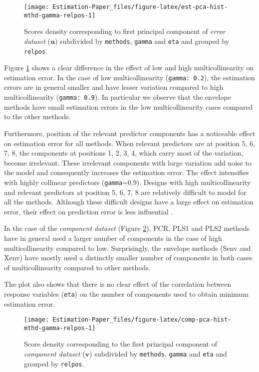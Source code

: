 \documentclass[12pt,3p,authoryear]{elsarticle}
\begin{document}
\begin{figure}[!htb]
\texttt{[image: Estimation-Paper\_files/figure-latex/est-pca-hist-mthd-gamma-relpos-1]} \caption{Scores density corresponding to first principal component of \emph{error dataset} (\(\mathbf{u}\)) subdivided by \texttt{methods}, \texttt{gamma} and \texttt{eta} and grouped by \texttt{relpos}.}\label{fig:est-pca-hist-mthd-gamma-relpos}
\end{figure}

Figure \ref{fig:est-pca-hist-mthd-gamma-relpos} shows a clear difference in the effect of low and high multicollinearity on estimation error. In the case of low multicollinearity (\texttt{gamma:\ 0.2}), the estimation errors are in general smaller and have lesser variation compared to high multicollinearity (\texttt{gamma:\ 0.9}). In particular we observe that the envelope methods have small estimation errors in the low multicollinearity cases compared to the other methods.

Furthermore, position of the relevant predictor components has a noticeable effect on estimation error for all methods. When relevant predictors are at position 5, 6, 7, 8, the components at positions 1, 2, 3, 4, which carry most of the variation, become irrelevant. These irrelevant components with large variation add noise to the model and consequently increases the estimation error. The effect intensifies with highly collinear predictors (\texttt{gamma}=0.9). Designs with high multicollinearity and relevant predictors at position 5, 6, 7, 8 are relatively difficult to model for all the methods. Although these difficult designs have a large effect on estimation error, their effect on prediction error is less influential \citep{rimal2019pred}.



In the case of the \emph{component dataset} (Figure \ref{fig:comp-pca-hist-mthd-gamma-relpos}), PCR, PLS1 and PLS2 methods have in general used a larger number of components in the case of high multicollinearity compared to low. Surprisingly, the envelope methods (Senv and Xenv) have mostly used a distinctly smaller number of components in both cases of multicollinearity compared to other methods.

The plot also shows that there is no clear effect of the correlation between response variables (\texttt{eta}) on the number of components used to obtain minimum estimation error.

\begin{figure}[!htb]
\texttt{[image: Estimation-Paper\_files/figure-latex/comp-pca-hist-mthd-gamma-relpos-1]} \caption{Score density corresponding to the first principal component of \emph{component dataset} (\(\mathbf{v}\)) subdivided by \texttt{methods}, \texttt{gamma} and \texttt{eta} and grouped by \texttt{relpos}.}\label{fig:comp-pca-hist-mthd-gamma-relpos}
\end{figure}
\end{document}
